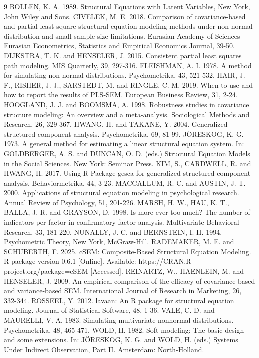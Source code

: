 \documentclass[twoside]{article}
\begin{document}
\begin{thebibliography}{9}
BOLLEN, K. A. 1989. Structural Equations with Latent Variables, New York, John Wiley and Sons.
CIVELEK, M. E. 2018. Comparison of covariance-based and partial least square structural equation modeling methods under non-normal distribution and small sample size limitations. Eurasian Academy of Sciences Eurasian Econometrics, Statistics and Empirical Economics Journal, 39-50.
DIJKSTRA, T. K. and HENSELER, J. 2015. Consistent partial least squares path modeling. MIS Quarterly, 39, 297-316.
FLEISHMAN, A. I. 1978. A method for simulating non-normal distributions. Psychometrika, 43, 521-532.
HAIR, J. F., RISHER, J. J., SARSTEDT, M. and RINGLE, C. M. 2019. When to use and how to report the results of PLS-SEM. European Business Review, 31, 2-24.
HOOGLAND, J. J. and BOOMSMA, A. 1998. Robustness studies in covariance structure modeling: An overview and a meta-analysis. Sociological Methods and Research, 26, 329-367.
HWANG, H. and TAKANE, Y. 2004. Generalized structured component analysis. Psychometrika, 69, 81-99.
JÖRESKOG, K. G. 1973. A general method for estimating a linear structural equation system. In: GOLDBERGER, A. S. and DUNCAN, O. D. (eds.) Structural Equation Models in the Social Sciences. New York: Seminar Press.
KIM, S., CARDWELL, R. and HWANG, H. 2017. Using R Package gesca for generalized structured component analysis. Behaviormetrika, 44, 3-23.
MACCALLUM, R. C. and AUSTIN, J. T. 2000. Applications of structural equation modeling in psychological research. Annual Review of Psychology, 51, 201-226.
MARSH, H. W., HAU, K. T., BALLA, J. R. and GRAYSON, D. 1998. Is more ever too much? The number of indicators per factor in confirmatory factor analysis. Multivariate Behavioral Research, 33, 181-220.
NUNALLY, J. C. and BERNSTEIN, I. H. 1994. Psychometric Theory, New York, McGraw-Hill.
RADEMAKER, M. E. and SCHUBERTH, F. 2025. cSEM: Composite-Based Structural Equation Modeling. R package version 0.6.1 [Online]. Available: https://CRAN.R-project.org/package=cSEM [Accessed].
REINARTZ, W., HAENLEIN, M. and HENSELER, J. 2009. An empirical comparison of the efficacy of covariance-based and variance-based SEM. International Journal of Research in Marketing, 26, 332-344.
ROSSEEL, Y. 2012. lavaan: An R package for structural equation modeling. Journal of Statistical Software, 48, 1-36.
VALE, C. D. and MAURELLI, V. A. 1983. Simulating multivariate nonnormal distributions. Psychometrika, 48, 465-471.
WOLD, H. 1982. Soft modeling: The basic design and some extensions. In: JÖRESKOG, K. G. and WOLD, H. (eds.) Systems Under Indirect Observation, Part II. Amsterdam: North-Holland.
\end{thebibliography}
\end{document}
